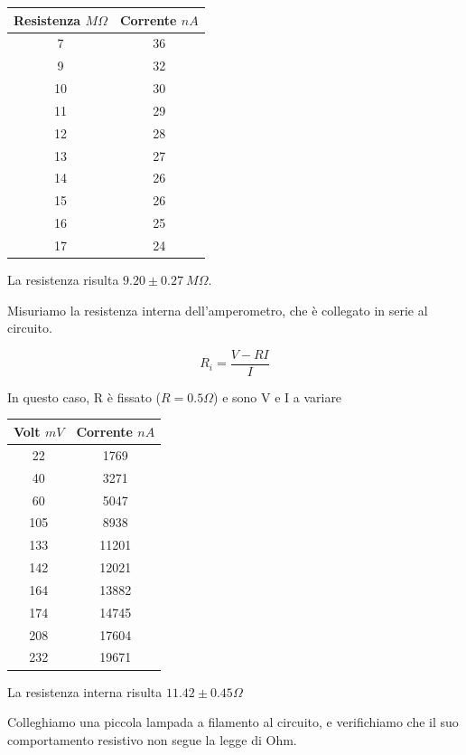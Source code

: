 \begin{center}
\begin{tabular}{*{2}{c}}
Resistenza $M\Omega$ & Corrente $nA$\\
\midrule
7&      36\\
9&      32\\
10& 30\\
11&     29\\
12&     28\\
13&     27\\
14&     26\\
15&     26\\
16&     25\\
17&     24\\

\end{tabular}

La resistenza risulta $9.20 \pm 0.27 \ M \Omega$.


Misuriamo la resistenza interna dell'amperometro, che è collegato in serie al circuito. 

$$R_i = \frac{V-RI}{I}$$

In questo caso, R è fissato ($R=0.5 \Omega$) e sono V e I a variare
\begin{tabular}{*{2}{c}}
Volt $mV$ & Corrente $nA$\\
\midrule
22&      1769\\
40&      3271\\
60&      5047\\
105&     8938\\
133&     11201\\
142&     12021\\
164&     13882\\
174&     14745\\
208&     17604\\
232&     19671\\



\end{tabular}

La resistenza interna risulta $11.42 \pm 0.45 \Omega$


\end{center}


Colleghiamo una piccola lampada a filamento al circuito, e verifichiamo che il suo comportamento resistivo non segue la legge di Ohm. 

